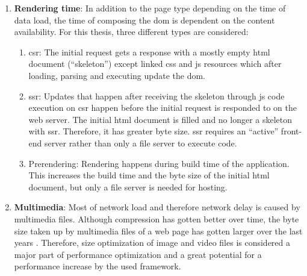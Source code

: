 \documentclass[a4paper, 12pt]{article}
\begin{document}
\begin{enumerate}
  \item \textbf{Rendering time}: In addition to the page type depending on the time of data load, the time of composing the \acrshort{dom} is dependent on the content availability.
  For this thesis, three different types are considered:
  \begin{enumerate}
    \item \acrfull{csr}: The initial request gets a response with a mostly empty \acrshort{html} document (\enquote{skeleton}) except linked \acrshort{css} and \acrshort{js} resources which after loading, parsing and executing update the \acrshort{dom}.
    \item \acrfull{ssr}: Updates that happen after receiving the skeleton through \acrshort{js} code execution on \acrshort{csr} happen before the initial request is responded to on the web server.
    The initial \acrshort{html} document is filled and no longer a skeleton with \acrshort{ssr}.
    Therefore, it has greater byte size.
    \acrlong{ssr} requires an \enquote{active} front-end server rather than only a file server to execute code.
    \item Prerendering: Rendering happens during build time of the application.
    This increases the build time and the byte size of the initial \acrshort{html} document, but only a file server is needed for hosting.
  \end{enumerate}

  \item \textbf{Multimedia}: Most of network load and therefore network delay is caused by multimedia files.
  Although compression has gotten better over time, the byte size taken up by multimedia files of a web page has gotten larger over the last years \citep{pageweightreport}.
  Therefore, size optimization of image and video files is considered a major part of performance optimization and a great potential for a performance increase by the used framework.

\end{enumerate}
\end{document}
